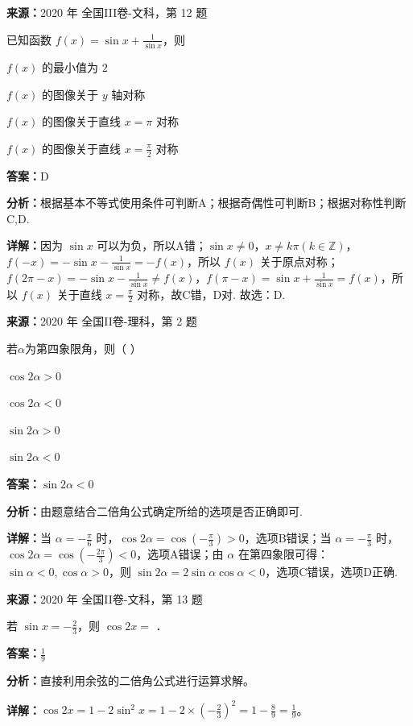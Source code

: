 \begin{question}[points=5]
\textbf{来源：}2020 年 全国III卷-文科，第 12 题\par
已知函数 $f(x)=\sin x+\frac{1}{\sin x}$，则
\begin{choices}
  \item $f(x)$ 的最小值为 $2$
  \item $f(x)$ 的图像关于 $y$ 轴对称
  \item $f(x)$ 的图像关于直线 $x=\pi$ 对称
  \item $f(x)$ 的图像关于直线 $x=\frac{\pi}{2}$ 对称
\end{choices}
\begin{solution}
\textbf{答案：}D

\textbf{分析：}根据基本不等式使用条件可判断A；根据奇偶性可判断B；根据对称性判断C,D.

\textbf{详解：}因为 $\sin x$ 可以为负，所以A错；$\sin x\neq0$，$x\neq k\pi(k\in\mathbb Z)$，$f(-x)=-\sin x-\frac{1}{\sin x}=-f(x)$，所以 $f(x)$ 关于原点对称；$f(2\pi-x)=-\sin x-\frac{1}{\sin x}\neq f(x)$，$f(\pi-x)=\sin x+\frac{1}{\sin x}=f(x)$，所以 $f(x)$ 关于直线 $x=\frac{\pi}{2}$ 对称，故C错，D对. 故选：D.
\end{solution}
\end{question}

\begin{question}[points=5]
\textbf{来源：}2020 年 全国II卷-理科，第 2 题\par
若$\alpha$为第四象限角，则（ ）
\begin{choices}
  \item $\cos2\alpha>0$
  \item $\cos2\alpha<0$
  \item $\sin2\alpha>0$
  \item $\sin2\alpha<0$
\end{choices}
\begin{solution}
\textbf{答案：}$\sin2\alpha<0$

\textbf{分析：}由题意结合二倍角公式确定所给的选项是否正确即可.

\textbf{详解：}当 $\alpha=-\frac{\pi}{6}$ 时，$\cos2\alpha=\cos\left(-\frac{\pi}{3}\right)>0$，选项B错误；当 $\alpha=-\frac{\pi}{3}$ 时，$\cos2\alpha=\cos\left(-\frac{2\pi}{3}\right)<0$，选项A错误；由 $\alpha$ 在第四象限可得：$\sin\alpha<0,\cos\alpha>0$，则 $\sin2\alpha=2\sin\alpha\cos\alpha<0$，选项C错误，选项D正确.
\end{solution}
\end{question}

\begin{question}[points=5]
\textbf{来源：}2020 年 全国II卷-文科，第 13 题\par
若 $\sin x = -\frac{2}{3}$，则 $\cos 2x = $ ．
\fillin[{$\frac{1}{9}$}]
\begin{solution}
\textbf{答案：}$\frac{1}{9}$

\textbf{分析：}直接利用余弦的二倍角公式进行运算求解。

\textbf{详解：}$\cos 2x = 1-2\sin^2 x = 1-2\times\left(-\frac{2}{3}\right)^2 = 1-\frac{8}{9} = \frac{1}{9}$。
\end{solution}
\end{question}


